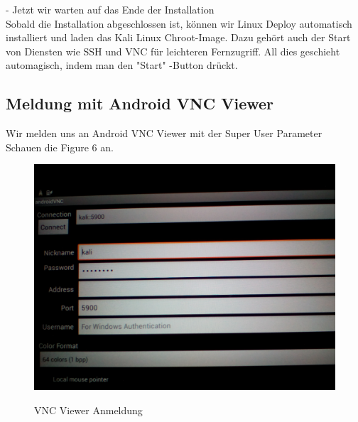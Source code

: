 \documentclass[11pt,a4paper]{article}
\begin{document}
- Jetzt wir warten auf das Ende der Installation \\
Sobald die Installation abgeschlossen ist, können wir Linux Deploy automatisch installiert und laden das Kali Linux Chroot-Image. Dazu gehört auch der Start von Diensten wie SSH und VNC für leichteren Fernzugriff. All dies geschieht automagisch, indem man den "Start" -Button drückt. 

\subsection{Meldung mit Android VNC Viewer}
Wir melden uns an Android VNC Viewer mit der Super User Parameter \\
Schauen die Figure 6 an. \\

\begin{figure}[H]
\begin{center} \includegraphics[scale=0.1]{./Image/img6}  \\
\caption{VNC Viewer Anmeldung}
\end{center}
\end{figure} 
\end{document}
